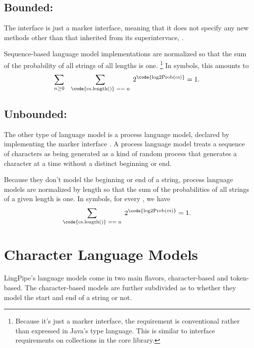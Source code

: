 \subsection{Bounded: }

The interface  is just a marker
interface, meaning that it does not specify any new methods other than
that inherited from its superintervace, .

Sequence-based language model implementations are normalized so
that the sum of the probability of all strings of all lengths is one.%
%
\footnote{Because it's just a marker interface, the requirement is
  conventional rather than expressed in Java's type language.  This is
  similar to interface requirements on collections in the
   core library.}
%
In symbols, this amounts to
%
\begin{equation}
\sum_{n \geq 0} \hspace*{8pt} \sum_{\text{\code{cs.length()} == n}} \hspace*{3pt} 2^{\text{\code{log2Prob(cs)}}} = 1.
\end{equation}

\subsection{Unbounded: }

The other type of language model is a process language model, declared
by implementing the marker interface .  A
process language model treats a sequence of characters as being
generated as a kind of random process that generates a character at a
time without a distinct beginning or end.  

Because they don't model the beginning or end of a string, process
language models are normalized by length so that the sum of the
probabilities of all strings of a given length is one.  In symbols,
for every , we have
%
\begin{equation}
\sum_{\text{\code{cs.length()} == n}} \hspace*{3pt} 2^{\text{\code{log2Prob(cs)}}} = 1.
\end{equation}
%


\section{Character Language Models}

LingPipe's language models come in two main flavors, character-based
and token-based.  The character-based models are further subdivided as
to whether they model the start and end of a string or not.







